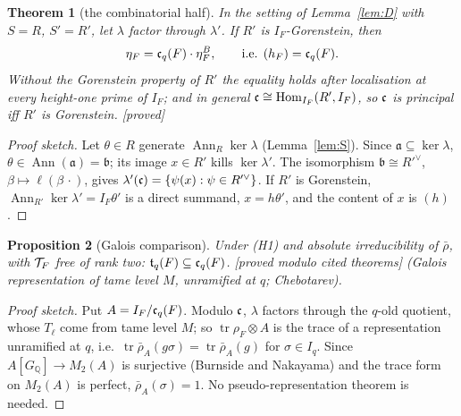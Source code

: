 \documentclass[11pt]{amsart}
\theoremstyle{plain}
\newtheorem{theorem}{Theorem}[section]
\newtheorem{proposition}[theorem]{Proposition}
\theoremstyle{definition}
\theoremstyle{remark}
\newcommand{\status}[1]{\textup{\textsf{[#1]}}}
\newcommand{\stproved}{\status{proved}}
\newcommand{\stpmc}{\status{proved modulo cited theorems}}
\newcommand{\Q}{\mathbb{Q}}\newcommand{\Z}{\mathbb{Z}}\newcommand{\R}{\mathbb{R}}\newcommand{\C}{\mathbb{C}}
\newcommand{\fa}{\mathfrak{a}}\newcommand{\fb}{\mathfrak{b}}
\DeclareMathOperator{\Hom}{Hom}\DeclareMathOperator{\coker}{coker}\DeclareMathOperator{\End}{End}
\DeclareMathOperator{\Ann}{Ann}\DeclareMathOperator{\rk}{rk}\DeclareMathOperator{\Stab}{Stab}
\DeclareMathOperator{\tr}{tr}\DeclareMathOperator{\Jac}{Jac}
\begin{document}
\begin{theorem}[the combinatorial half]\label{thm:E}
In the setting of Lemma~\ref{lem:D} with $S=R$, $S'=R'$, let $\lambda$ factor through $\lambda'$. If $R'$ is $I_F$-Gorenstein, then
\[\eta_F=\mathfrak{c}_q(F)\cdot\eta^B_F,\qquad\text{i.e. }(h_F)=\mathfrak{c}_q(F).\]
Without the Gorenstein property of $R'$ the equality holds after localisation at every height-one prime of $I_F$; and in general $\cc\cong\Hom_{I_F}(R',I_F)$, so $\mathfrak{c}$ is principal iff $R'$ is Gorenstein. \stproved
\end{theorem}
\begin{proof}[Proof sketch]
Let $\theta\in R$ generate $\Ann_R\ker\lambda$ (Lemma~\ref{lem:S}). Since $\fa\subseteq\ker\lambda$, $\theta\in\Ann(\fa)=\fb$; its image $x\in R'$ kills $\ker\lambda'$. The isomorphism $\fb\cong R'^\vee$, $\beta\mapsto\ell(\beta\,\cdot)$, gives $\lambda'(\mathfrak{c})=\{\psi(x):\psi\in R'^\vee\}$. If $R'$ is Gorenstein, $\Ann_{R'}\ker\lambda'=I_F\theta'$ is a direct summand, $x=h\theta'$, and the content of $x$ is $(h)$.
\end{proof}

\begin{proposition}[Galois comparison]\label{prop:galois}
Under (H1) and absolute irreducibility of $\bar\rho$, with $\mathcal{T}_F$ free of rank two: $\mathfrak{t}_q(F)\subseteq\mathfrak{c}_q(F)$. \stpmc{} (Galois representation of tame level $M$, unramified at $q$; Chebotarev).
\end{proposition}
\begin{proof}[Proof sketch]
Put $A=I_F/\mathfrak{c}_q(F)$. Modulo $\mathfrak{c}$, $\lambda$ factors through the $q$-old quotient, whose $T_\ell$ come from tame level $M$; so $\tr\rho_F\otimes A$ is the trace of a representation unramified at $q$, i.e.\ $\tr\bar\rho_A(g\sigma)=\tr\bar\rho_A(g)$ for $\sigma\in I_q$. Since $A[G_\Q]\to M_2(A)$ is surjective (Burnside and Nakayama) and the trace form on $M_2(A)$ is perfect, $\bar\rho_A(\sigma)=1$. No pseudo-representation theorem is needed.
\end{proof}
\end{document}
